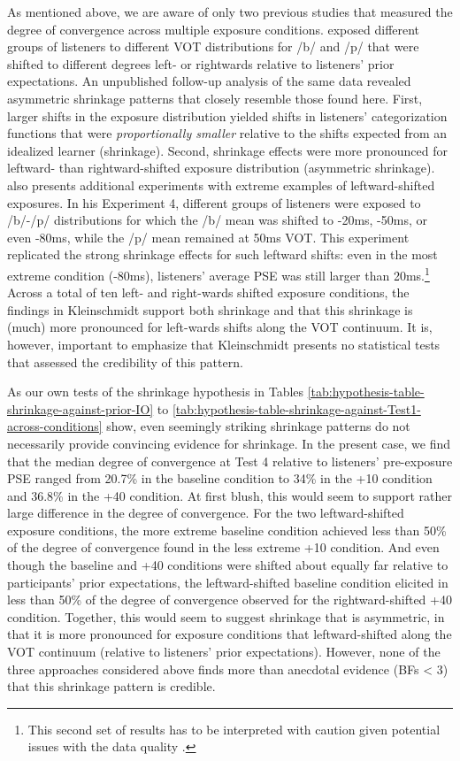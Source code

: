 \documentclass[
  11pt,
  man,mask,floatsintext]{apa6}
\begin{document}
As mentioned above, we are aware of only two previous studies that measured the degree of convergence across multiple exposure conditions. \textcite{kleinschmidt-jaeger2016} exposed different groups of listeners to different VOT distributions for /b/ and /p/ that were shifted to different degrees left- or rightwards relative to listeners' prior expectations. An unpublished follow-up analysis of the same data \autocite{kleinschmidt2020} revealed asymmetric shrinkage patterns that closely resemble those found here. First, larger shifts in the exposure distribution yielded shifts in listeners' categorization functions that were \emph{proportionally smaller} relative to the shifts expected from an idealized learner (shrinkage). Second, shrinkage effects were more pronounced for leftward- than rightward-shifted exposure distribution (asymmetric shrinkage). \textcite{kleinschmidt2020} also presents additional experiments with extreme examples of leftward-shifted exposures. In his Experiment 4, different groups of listeners were exposed to /b/-/p/ distributions for which the /b/ mean was shifted to -20ms, -50ms, or even -80ms, while the /p/ mean remained at 50ms VOT. This experiment replicated the strong shrinkage effects for such leftward shifts: even in the most extreme condition (-80ms), listeners' average PSE was still larger than 20ms.\footnote{This second set of results has to be interpreted with caution given potential issues with the data quality \autocite[cf.][p.~25]{kleinschmidt2020}.} Across a total of ten left- and right-wards shifted exposure conditions, the findings in Kleinschmidt support both shrinkage and that this shrinkage is (much) more pronounced for left-wards shifts along the VOT continuum. It is, however, important to emphasize that Kleinschmidt presents no statistical tests that assessed the credibility of this pattern.

As our own tests of the shrinkage hypothesis in Tables \ref{tab:hypothesis-table-shrinkage-against-prior-IO} to \ref{tab:hypothesis-table-shrinkage-against-Test1-across-conditions} show, even seemingly striking shrinkage patterns do not necessarily provide convincing evidence for shrinkage. In the present case, we find that the median degree of convergence at Test 4 relative to listeners' pre-exposure PSE ranged from 20.7\% in the baseline condition to 34\% in the +10 condition and 36.8\% in the +40 condition. At first blush, this would seem to support rather large difference in the degree of convergence. For the two leftward-shifted exposure conditions, the more extreme baseline condition achieved less than 50\% of the degree of convergence found in the less extreme +10 condition. And even though the baseline and +40 conditions were shifted about equally far relative to participants' prior expectations, the leftward-shifted baseline condition elicited in less than 50\% of the degree of convergence observed for the rightward-shifted +40 condition. Together, this would seem to suggest shrinkage that is asymmetric, in that it is more pronounced for exposure conditions that leftward-shifted along the VOT continuum (relative to listeners' prior expectations). However, none of the three approaches considered above finds more than anecdotal evidence (BFs \textless{} 3) that this shrinkage pattern is credible.
\end{document}
